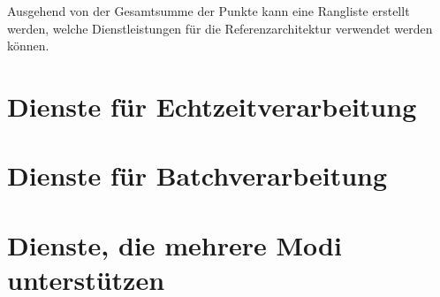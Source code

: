 Ausgehend von der Gesamtsumme der Punkte kann eine Rangliste erstellt werden, welche Dienstleistungen für die Referenzarchitektur verwendet werden können.



\section{Dienste für Echtzeitverarbeitung}\label{produkte:echtzeit}



\section{Dienste für Batchverarbeitung}



\section{Dienste, die mehrere Modi unterstützen}



